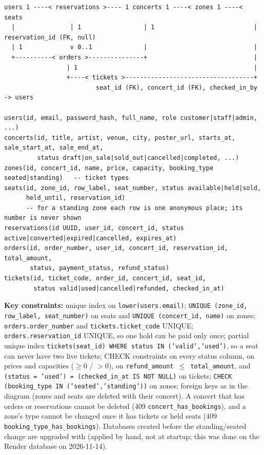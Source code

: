 \documentclass[11pt,a4paper]{article}
\newcommand{\code}[1]{\begingroup\let\codeus\_\renewcommand{\_}{\codeus\allowbreak}\texttt{#1}\endgroup}
\begin{document}
\begin{lstlisting}
users 1 ----< reservations >---- 1 concerts 1 ----< zones 1 ----< seats
  |               | 1                 | 1                           |  reservation_id (FK, null)
  | 1             v 0..1              |                             |
  +----------< orders >---------------+                             |
                 | 1                                                |
                 +----< tickets >-----------------------------------+
                         seat_id (FK), concert_id (FK), checked_in_by -> users

users(id, email, password_hash, full_name, role customer|staff|admin, ...)
concerts(id, title, artist, venue, city, poster_url, starts_at, sale_start_at, sale_end_at,
         status draft|on_sale|sold_out|cancelled|completed, ...)
zones(id, concert_id, name, price, capacity, booking_type seated|standing)   -- ticket types
seats(id, zone_id, row_label, seat_number, status available|held|sold,
      held_until, reservation_id)
      -- for a standing zone each row is one anonymous place; its number is never shown
reservations(id UUID, user_id, concert_id, status active|converted|expired|cancelled, expires_at)
orders(id, order_number, user_id, concert_id, reservation_id, total_amount,
       status, payment_status, refund_status)
tickets(id, ticket_code, order_id, concert_id, seat_id,
        status valid|used|cancelled|refunded, checked_in_at)
\end{lstlisting}
\textbf{Key constraints:} unique index on \code{lower(users.\allowbreak{}email)};
\code{UNIQUE (zone\_id, row\_label, seat\_number)} on seats and \code{UNIQUE (concert\_id, name)} on zones;
\code{orders.\allowbreak{}order\_number} and \code{tickets.\allowbreak{}ticket\_code} UNIQUE; \code{orders.\allowbreak{}reservation\_id} UNIQUE,
so one hold can be paid only once; partial unique index \code{tickets(seat\_id) WHERE status IN ('valid','used')},
so a seat can never have two live tickets; CHECK constraints on every status column, on prices and
capacities ($\geq 0$ / $> 0$), on \code{refund\_amount $\leq$ total\_amount}, and
\code{(status = 'used') = (checked\_in\_at IS NOT NULL)} on tickets;
\code{CHECK (booking\_type IN ('seated','standing'))} on zones; foreign keys as in the diagram
(zones and seats are deleted with their concert). A concert that has orders or reservations
cannot be deleted (409 \code{concert\_has\_bookings}), and a zone's type cannot be changed once it has
tickets or held seats (409 \code{booking\_type\_has\_bookings}). Databases created before the
standing/seated change are upgraded with 
(applied by hand, not at startup; this was done on the Render database on 2026-11-14).
\end{document}
